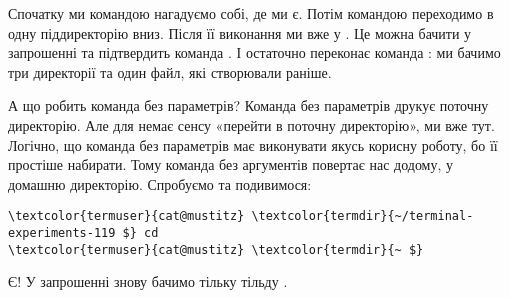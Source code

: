 Спочатку ми командою  нагадуємо собі, де ми є.
Потім командою  переходимо в одну піддиректорію вниз.
Після її виконання ми вже у .
Це можна бачити у запрошенні та підтвердить команда .
І остаточно переконає команда : ми бачимо три директорії та один файл, які створювали раніше.

А що робить команда  без параметрів?
Команда  без параметрів друкує поточну директорію.
Але для  немає сенсу «перейти в поточну директорію», ми вже тут.
Логічно, що команда без параметрів має виконувати якусь корисну роботу, бо її простіше набирати.
Тому команда  без аргументів повертає нас додому, у домашню директорію.
Спробуємо та подивимося:

\begin{Verbatim}[fontsize=\footnotesize,commandchars=\\\{\},xleftmargin=\parindent]
\textcolor{termuser}{cat@mustitz} \textcolor{termdir}{~/terminal-experiments-119 $} cd
\textcolor{termuser}{cat@mustitz} \textcolor{termdir}{~ $}
\end{Verbatim}

Є! У запрошенні знову бачимо тільку тільду \file{\textasciitilde}.

